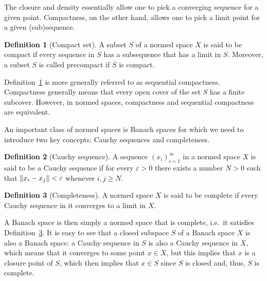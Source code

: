 \documentclass[english, 12pt, a4paper, sci, utf8, a-2b, online]{aaltothesis}
\theoremstyle{definition}
\newtheorem{definition}{Definition}[section]
\theoremstyle{plain}
\DeclarePairedDelimiter\norm{\lVert}{\rVert}
\numberwithin{equation}{section}
\begin{document}
The closure and density essentially allow one to pick a converging sequence
for a given point. Compactness, on the other hand, allows one to pick
a limit point for a given (sub)sequence.
\begin{definition}[Compact set]
    \label{def:compactsubset}
    A subset $S$ of a normed space $X$ is said to be compact if every sequence
    in $S$ has a subsequence that has a limit in $S$.
    Moreover, a subset $S$ is called precompact if $\overline{S}$
    is compact.
\end{definition}
Definition~\ref{def:compactsubset} is more generally referred to as
sequential compactness. Compactness generally means that every open cover of the
set $S$ has a finite subcover. However, in normed spaces,
compactness and sequential compactness are equivalent.

An important class of normed spaces is Banach spaces for which we need
to introduce two key concepts: Cauchy sequences and completeness.
\begin{definition}[Cauchy sequence]
    \label{def:cauchysequence}
    A sequence $(x_i)_{i=1}^{\infty}$ in a normed space $X$ is said to be
    a Cauchy sequence if for every $\varepsilon > 0$ there exists
    a number $N > 0$ such that
    $\norm{x_i - x_j} < \varepsilon$ whenever $i,j \geq N$.
\end{definition}
\begin{definition}[Completeness]
    \label{def:completeness}
    A normed space $X$ is said to be complete if every Cauchy sequence in it
    converges to a limit in $X$.
\end{definition}
A Banach space is then simply a normed space that is complete, i.e.\ it
satisfies Definition~\ref{def:completeness}.
It is easy to see that a closed subspace $S$ of a Banach space $X$ is also
a Banach space: a Cauchy sequence in $S$ is also a Cauchy sequence in $X$,
which means that it converges to some point $x \in X$, but this implies
that $x$ is a closure point of $S$, which then implies that $x \in S$
since $S$ is closed and, thus, $S$ is complete.
\end{document}
